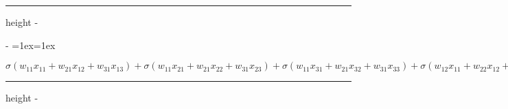\documentclass[letterpaper,10pt,english]{sphinxmanual}
\makeatletter
\newenvironment{nbsphinxfancyoutput}{%
    \let\sphinxincludegraphics\nbsphinxincludegraphics
    \nbsphinx@image@maxheight\textheight
    \advance\nbsphinx@image@maxheight -2\fboxsep   %
    \advance\nbsphinx@image@maxheight -2\fboxrule  %
    \advance\nbsphinx@image@maxheight -\baselineskip
\def\nbsphinxfcolorbox{\spx@fcolorbox{nbsphinx-code-border}{white}}%
\def\FrameCommand{\nbsphinxfcolorbox\nbsphinxfancyaddprompt\@empty}%
\def\FirstFrameCommand{\nbsphinxfcolorbox\nbsphinxfancyaddprompt\sphinxVerbatim@Continues}%
\def\MidFrameCommand{\nbsphinxfcolorbox\sphinxVerbatim@Continued\sphinxVerbatim@Continues}%
\def\LastFrameCommand{\nbsphinxfcolorbox\sphinxVerbatim@Continued\@empty}%
\MakeFramed{\advance\hsize-\width\@totalleftmargin\z@\linewidth\hsize\@setminipage}%
\lineskip=1ex\lineskiplimit=1ex\raggedright%
}{\par\unskip\@minipagefalse\endMakeFramed}
\def\nbsphinxfancyaddprompt{\ifvoid\nbsphinxpromptbox\else
    \kern\fboxrule\kern\fboxsep
    \copy\nbsphinxpromptbox
    \kern-\ht\nbsphinxpromptbox\kern-\dp\nbsphinxpromptbox
    \kern-\fboxsep\kern-\fboxrule\nointerlineskip
    \fi}
\newlength\nbsphinxcodecellspacing
\newcommand*{\nbsphinxincludegraphics}[2][]{%
    \gdef\spx@includegraphics@options{#1}%
    \setbox\spx@image@box\hbox{\texttt{[image: \#2]}}%
    \in@false
    \ifdim \wd\spx@image@box>\linewidth
      \g@addto@macro\spx@includegraphics@options{,width=\linewidth}%
      \in@true
    \fi
    \ifdim \ht\spx@image@box>\nbsphinx@image@maxheight
      \g@addto@macro\spx@includegraphics@options{,height=\nbsphinx@image@maxheight}%
      \in@true
    \fi
    \ifin@
      \g@addto@macro\spx@includegraphics@options{,keepaspectratio}%
    \fi
    \setbox\spx@image@box\box\voidb@x %
    \expandafter\includegraphics\expandafter[\spx@includegraphics@options]{#2}%
}%
\makeatother
\begin{document}
\hrule height -\fboxrule\relax
\vspace{\nbsphinxcodecellspacing}

\savebox\nbsphinxpromptbox[0pt][r]{\color{nbsphinxout}\Verb|\strut{[106]:}\,|}

\begin{nbsphinxfancyoutput}
$\displaystyle \sigma{\left(w_{11} x_{11} + w_{21} x_{12} + w_{31} x_{13} \right)} + \sigma{\left(w_{11} x_{21} + w_{21} x_{22} + w_{31} x_{23} \right)} + \sigma{\left(w_{11} x_{31} + w_{21} x_{32} + w_{31} x_{33} \right)} + \sigma{\left(w_{12} x_{11} + w_{22} x_{12} + w_{32} x_{13} \right)} + \sigma{\left(w_{12} x_{21} + w_{22} x_{22} + w_{32} x_{23} \right)} + \sigma{\left(w_{12} x_{31} + w_{22} x_{32} + w_{32} x_{33} \right)}$
\end{nbsphinxfancyoutput}

{
\begin{sphinxVerbatim}[commandchars=\\\{\}]
\llap{\color{nbsphinxin}[107]:\,\hspace{\fboxrule}\hspace{\fboxsep}}
\end{sphinxVerbatim}
}

\hrule height -\fboxrule\relax
\vspace{\nbsphinxcodecellspacing}

\savebox\nbsphinxpromptbox[0pt][r]{\color{nbsphinxout}\Verb|\strut{[107]:}\,|}
\end{document}
